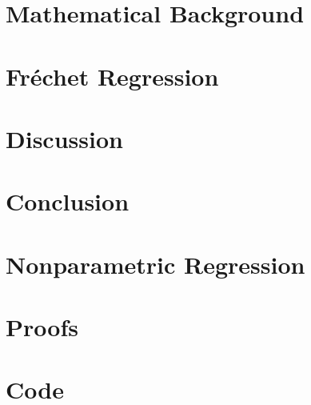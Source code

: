 \documentclass[12pt, a4paper, bibtotoc, liststotoc]{scrartcl}
\begin{document}
\section{Mathematical Background}
\label{sec:maths}


\section{Fréchet Regression}
\label{sec:fréchet regression}


\section{Discussion}
\label{sec:discussion}

\section{Conclusion}
\label{sec:conclusion}





\newpage
\appendix
{}

\section{Nonparametric Regression}
\label{sec:npregression}

\section{Proofs}
\label{sec:proofs}

\section{Code}
\label{sec:code}



\newpage

\nocite{von_gaudecker_templates_2019}
\printbibliography
\end{document}
